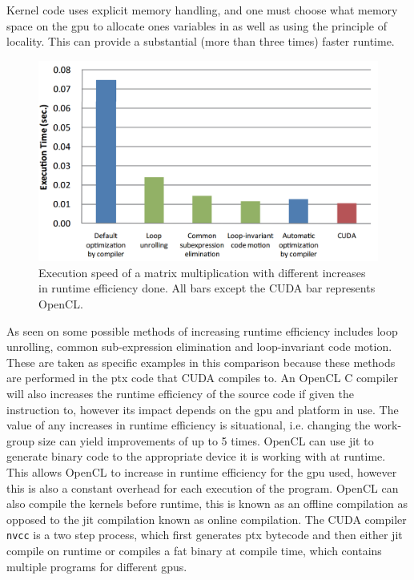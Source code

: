 Kernel code uses explicit memory handling, and one must choose what memory space on the \acrshort{gpu} to allocate ones variables in as well as using the principle of locality.
This can provide a substantial (more than three times) faster runtime. \citep{ocl_lecture3}
\begin{figure}[h]
\centering	
 \includegraphics[width=1\textwidth]{figures/opencloptimisation.png} %
\caption{Execution speed of a matrix multiplication with different increases in runtime efficiency done. All bars except the CUDA bar represents OpenCL.  \citep{CUDAOpenCLOptimisation}}\label{image:OpenCLOptCompare}
\vspace{-15pt}
\end{figure}
As seen on  some possible methods of increasing runtime efficiency includes loop unrolling, common sub-expression elimination and loop-invariant code motion. 
These are taken as specific examples in this comparison because these methods are performed in the \acrfull{ptx} code that CUDA compiles to.
An OpenCL C compiler will also increases the runtime efficiency of the source code if given the instruction to, however its impact depends on the \acrshort{gpu} and platform in use.
The value of any increases in runtime efficiency is situational, i.e. changing the work-group size can yield improvements of up to 5 times. \citep{ocl_lecture3}
OpenCL can use \acrshort{jit} to generate binary code to the appropriate device it is working with at runtime.
This allows OpenCL to increase in runtime efficiency for the \acrshort{gpu} used, however this is also a constant overhead for each execution of the program. 
OpenCL can also compile the kernels before runtime, this is known as an offline compilation as opposed to the \acrshort{jit} compilation known as online compilation. 
The CUDA compiler \texttt{nvcc} is a two step process, which first generates \acrshort{ptx} bytecode and then either \acrshort{jit} compile on runtime or compiles a fat binary at compile time, which contains multiple programs for different \acrshort{gpu}s. \citep{nvidia_cude_fat_bin}

